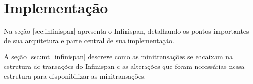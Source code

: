 \documentclass[11pt,twoside,a4paper]{book}
\begin{document}




\chapter{Implementação}
\label{chap:implementacao}
Na seção \ref{sec:infinispan} apresenta o Infinispan, detalhando os pontos importantes de sua arquitetura e parte central de sua implementação. 

A seção \ref{sec:mt_infinispan} descreve como as minitransações se encaixam na estrutura de transações do Infinispan e as alterações que foram necessárias nessa estrutura para disponibilizar as minitransações.
\end{document}
